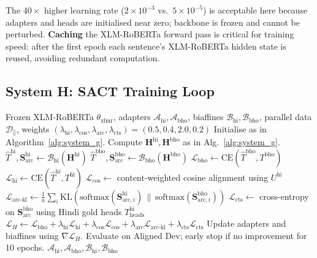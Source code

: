 \documentclass[12pt,a4paper,oneside]{report}
\newcommand{\xlmr}{XLM-RoBERTa}
\begin{document}
The $40\times$ higher learning rate ($2\times10^{-3}$ vs.\ $5\times10^{-5}$) is
acceptable here because adapters and heads are initialised near zero;
backbone is frozen and cannot be perturbed. \textbf{Caching} the \xlmr{}
forward pass is critical for training speed: after the first epoch each
sentence's \xlmr{} hidden state is reused, avoiding redundant computation.

\subsection{System H: SACT Training Loop}

\begin{algorithm}[ht]
\caption{System H (SACT) training with three syntax-aware losses.}
\label{alg:system_h}
\begin{algorithmic}[1]
\Require Frozen \xlmr{} $\theta_{\text{xlmr}}$, adapters $\mathcal{A}_{\text{hi}},
         \mathcal{A}_{\text{bho}}$, biaffines $\mathcal{B}_{\text{hi}},
         \mathcal{B}_{\text{bho}}$, parallel data $\mathcal{D}_\parallel$,
         weights $(\lambda_{\text{hi}}, \lambda_{\text{cos}}, \lambda_{\text{arc}},
         \lambda_{\text{cts}}) = (0.5, 0.4, 2.0, 0.2)$
\State Initialise as in Algorithm~\ref{alg:system_g}.
    \State Compute $\mathbf{H}^{\text{hi}}, \mathbf{H}^{\text{bho}}$ as in Alg.~\ref{alg:system_g}.
    \State $\hat{T}^{\text{hi}}, \mathbf{S}^{\text{hi}}_{\text{arc}} \gets \mathcal{B}_{\text{hi}}(\mathbf{H}^{\text{hi}})$
    \State $\hat{T}^{\text{bho}}, \mathbf{S}^{\text{bho}}_{\text{arc}} \gets \mathcal{B}_{\text{bho}}(\mathbf{H}^{\text{bho}})$
    \State $\mathcal{L}_{\text{bho}} \gets \text{CE}(\hat{T}^{\text{bho}}, T^{\text{bho}})$
    \State $\mathcal{L}_{\text{hi}} \gets \text{CE}(\hat{T}^{\text{hi}}, T^{\text{hi}})$
    \State $\mathcal{L}_{\text{cos}} \gets$ content-weighted cosine alignment using $U^{\text{hi}}$
    \State $\mathcal{L}_{\text{arc-kl}} \gets \frac{1}{n}\sum_i \mathrm{KL}(\text{softmax}(\mathbf{S}^{\text{hi}}_{\text{arc},i}) \,\|\, \text{softmax}(\mathbf{S}^{\text{bho}}_{\text{arc},i}))$
    \State $\mathcal{L}_{\text{cts}} \gets$ cross-entropy on $\mathbf{S}^{\text{bho}}_{\text{arc}}$ using Hindi gold heads $T^{\text{hi}}_{\text{heads}}$
    \State $\mathcal{L}_H \gets \mathcal{L}_{\text{bho}} + \lambda_{\text{hi}}\mathcal{L}_{\text{hi}} + \lambda_{\text{cos}}\mathcal{L}_{\text{cos}} + \lambda_{\text{arc}}\mathcal{L}_{\text{arc-kl}} + \lambda_{\text{cts}}\mathcal{L}_{\text{cts}}$
    \State Update adapters and biaffines using $\nabla \mathcal{L}_H$.
  \EndFor
  \State Evaluate on Aligned Dev; early stop if no improvement for 10 epochs.
\EndFor
\State \Return $\mathcal{A}_{\text{hi}}, \mathcal{A}_{\text{bho}}, \mathcal{B}_{\text{hi}}, \mathcal{B}_{\text{bho}}$
\end{algorithmic}
\end{algorithm}
\end{document}

